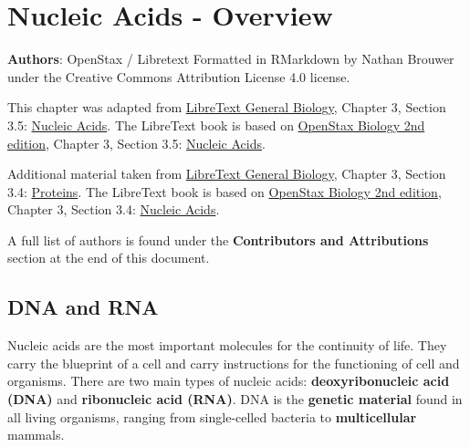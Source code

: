 \documentclass[
]{book}
\begin{document}
\hypertarget{nucleic-acids-review}{%
\section{Nucleic Acids - Overview}\label{nucleic-acids-review}}

\textbf{Authors}: OpenStax / Libretext Formatted in RMarkdown by Nathan
Brouwer under the Creative Commons Attribution License 4.0 license.

This chapter was adapted from \href{https://bio.libretexts.org/Bookshelves/Introductory_and_General_Biology/Book\%3A_General_Biology_(OpenStax)}{LibreText General
Biology},
Chapter 3, Section 3.5: \href{https://bio.libretexts.org/Bookshelves/Introductory_and_General_Biology/Book\%3A_General_Biology_(OpenStax)/1\%3A_The_Chemistry_of_Life/3\%3A_Biological_Macromolecules/3.5\%3A_Nucleic_Acids}{Nucleic
Acids}.
The LibreText book is based on \href{https://openstax.org/details/books/biology-2e}{OpenStax Biology 2nd
edition}, Chapter 3,
Section 3.5: \href{https://openstax.org/books/biology-2e/pages/3-5-nucleic-acids}{Nucleic
Acids}.

Additional material taken from \href{}{LibreText General Biology}, Chapter 3,
Section 3.4:
\href{https://bio.libretexts.org/Bookshelves/Introductory_and_General_Biology/Book\%3A_General_Biology_(OpenStax)/1\%3A_The_Chemistry_of_Life/3\%3A_Biological_Macromolecules/3.4\%3A_Proteins}{Proteins}.
The LibreText book is based on \href{https://openstax.org/details/books/biology-2e}{OpenStax Biology 2nd
edition}, Chapter 3,
Section 3.4: \href{https://openstax.org/books/biology-2e/pages/3-4-proteins}{Nucleic
Acids}.

A full list of authors is found under the \textbf{Contributors and
Attributions} section at the end of this document.

\hypertarget{dna-and-rna}{%
\subsection{DNA and RNA}\label{dna-and-rna}}

Nucleic acids are the most important molecules for the continuity of
life. They carry the blueprint of a cell and carry instructions for the
functioning of cell and organisms. There are two main types of nucleic
acids: \textbf{deoxyribonucleic acid (DNA)} and \textbf{ribonucleic acid (RNA)}.
DNA is the \textbf{genetic material} found in all living organisms, ranging
from single-celled bacteria to \textbf{multicellular} mammals.
\end{document}
